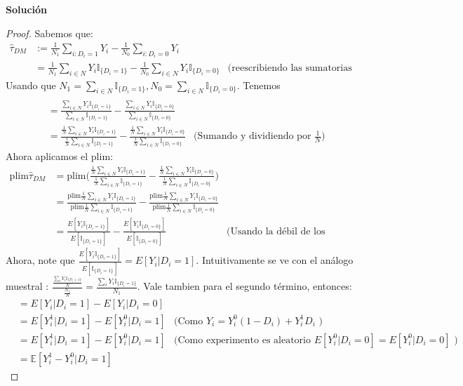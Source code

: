 \documentclass[a4paper, answers, addpoints, 11pt]{exam}
\newenvironment{solucion}{%
  \begin{mdframed}[
    backgroundcolor=blue!5,    %
    linecolor=blue!50,          %
    linewidth=2pt,              %
    leftmargin=10pt,            %
    rightmargin=10pt,           %
    topline=true,              %
    bottomline=true,            %
    roundcorner=10pt,           %
    innerleftmargin=10pt,       %
    innerrightmargin=10pt,      %
    innerbottommargin=10pt,     %
    innertopmargin=10pt         %
  ]%
  \begin{tcolorbox}[colframe=blue!50!black, colback=blue!50, coltitle=white, sharp corners=all, boxrule=1mm, width=\textwidth, halign=left, valign=center, top=0mm, bottom=0mm, left=0mm, right=0mm] \textbf{Solución} \end{tcolorbox} }{\end{mdframed}}
\begin{document}
\begin{itemize}
\begin{solucion}
        \begin{proof}
       Sabemos que:
        \begin{align*}
    \widehat{\tau}_{DM} &:= \frac{1}{N_1} \sum_{i: D_i=1} Y_i - \frac{1}{N_0} \sum_{i: D_i=0} Y_i \\&=
  \frac{1}{N_1} \sum_{i \in N} Y_i \mathbb{I}_{\{D_i=1\}} -\frac{1}{N_0} \sum_{i \in N} Y_i \mathbb{I}_{\{D_i=0\}}  &\text{(reescribiendo las sumatorias en términos de N)} 
  \end{align*}
  Usando que $N_1=\sum_{i \in N}  \mathbb{I}_{\{D_i=1\}}, N_0=\sum_{i \in N}  \mathbb{I}_{\{D_i=0\}}$. Tenemos
  \begin{align*}
  \\&=
   \frac{\sum_{i \in N} Y_i \mathbb{I}_{\{D_i=1\}}}{\sum_{i \in N}  \mathbb{I}_{\{D_i=1\}}}  -\frac{\sum_{i \in N} Y_i \mathbb{I}_{\{D_i=0\}}  }{\sum_{i \in N} \mathbb{I}_{\{D_i=0\}}} 
   \\&=
    \frac{\frac{1}{N}\sum_{i \in N} Y_i \mathbb{I}_{\{D_i=1\}}}{\frac{1}{N} \sum_{i \in N}  \mathbb{I}_{\{D_i=1\}}}  -\frac{\frac{1}{N}\sum_{i \in N} Y_i \mathbb{I}_{\{D_i=0\}}  }{\frac{1}{N}\sum_{i \in N} \mathbb{I}_{\{D_i=0\}}} &\text{(Sumando y dividiendo por $\frac{1}{N}$)} 
   \end{align*}
   Ahora aplicamos el plim:
  \begin{align*}
    \text{plim} \widehat{\tau}_{DM}&=  \text{plim} \bigg( \frac{\frac{1}{N}\sum_{i \in N} Y_i \mathbb{I}_{\{D_i=1\}}}{\frac{1}{N} \sum_{i \in N}  \mathbb{I}_{\{D_i=1\}}}  -\frac{\frac{1}{N}\sum_{i \in N} Y_i \mathbb{I}_{\{D_i=0\}}  }{\frac{1}{N}\sum_{i \in N} \mathbb{I}_{\{D_i=0\}}} \bigg) \\&=
     \frac{\text{plim}\frac{1}{N}\sum_{i \in N} Y_i \mathbb{I}_{\{D_i=1\}}}{\text{plim} \frac{1}{N} \sum_{i \in N}  \mathbb{I}_{\{D_i=1\}}}  -\frac{\text{plim}\frac{1}{N}\sum_{i \in N} Y_i \mathbb{I}_{\{D_i=0\}}  }{\text{plim}\frac{1}{N}\sum_{i \in N} \mathbb{I}_{\{D_i=0\}}}  \\&=
     \frac{E[ Y_i \mathbb{I}_{\{D_i=1\}}]}
     {E[\mathbb{I}_{\{D_i=1\}}] }  -\frac{E[ Y_i \mathbb{I}_{\{D_i=0\}}] }{E[\mathbb{I}_{\{D_i=0\}}]} &\text{(Usando la débil de los grandes números)} 
\end{align*}
Ahora, note que $\frac{E[ Y_i \mathbb{I}_{\{D_i=1\}}]}
     {E[\mathbb{I}_{\{D_i=1\}}] }= E[ Y_i| D_i=1]$. Intuitivamente se ve con el análogo muestral : $\frac{\frac{\sum_i Y_i \mathbb{I}_{\{D_i=1\}}}{N}}{\frac{N_1}{N}}=\frac{\sum_i Y_i \mathbb{I}_{\{D_i=1\}}}{N_1}$. Vale tambien para el segundo término, entonces:
\begin{align*}
&=E[Y_i | D_i = 1] - E[Y_i | D_i = 0]\\&=E[Y_i^{1}  | D_i = 1] - E[Y_i^{0}  | D_i = 1] &\text{(Como $Y_i=Y_i^{0} (1-D_i)+ Y_i^{1} D_i$ )}
\\&=E[Y_i^{1}  | D_i = 1] - E[Y_i^{0}  | D_i = 1] &\text{(Como experimento es aleatorio $E[Y_i^{0} | D_i = 0]=E[Y_i^{0} | D_i = 0] $ )}\\&=\mathbb{E}[Y^{1}_{i} - Y^{0}_{i} | D_i = 1]
\end{align*}


\end{proof}
\end{solucion}
\end{itemize}
\end{document}
